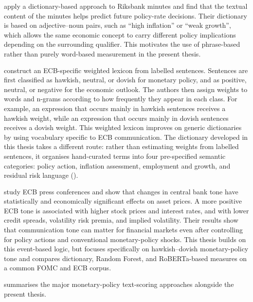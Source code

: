 \citet{apel2014} apply a dictionary-based approach to Riksbank minutes
and find that the textual content of the minutes helps predict future
policy-rate decisions. Their dictionary is based on adjective--noun
pairs, such as ``high inflation'' or ``weak growth'', which allows the
same economic concept to carry different policy implications depending
on the surrounding qualifier. This motivates the use of phrase-based
rather than purely word-based measurement in the present thesis.

\citet{picault2017} construct an ECB-specific weighted lexicon from
labelled sentences. Sentences are first classified as hawkish, neutral,
or dovish for monetary policy, and as positive, neutral, or negative for
the economic outlook. The authors then assign weights to words and
n-grams according to how frequently they appear in each class. For
example, an expression that occurs mainly in hawkish sentences receives a
hawkish weight, while an expression that occurs mainly in dovish
sentences receives a dovish weight. This weighted lexicon improves on
generic dictionaries by using vocabulary specific to ECB communication.
The dictionary developed in this thesis takes a different route: rather
than estimating weights from labelled sentences, it organises
hand-curated terms into four pre-specified semantic categories: policy
action, inflation assessment, employment and growth, and residual risk
language ().

\citet{schmeling2019} study ECB press conferences and show that changes
in central bank tone have statistically and economically significant
effects on asset prices. A more positive ECB tone is associated with
higher stock prices and interest rates, and with lower credit spreads,
volatility risk premia, and implied volatility. Their results show that
communication tone can matter for financial markets even after
controlling for policy actions and conventional monetary-policy shocks.
This thesis builds on this event-based logic, but focuses specifically on
hawkish--dovish monetary-policy tone and compares dictionary, Random
Forest, and RoBERTa-based measures on a common FOMC and ECB corpus.

 summarises the major monetary-policy
text-scoring approaches alongside the present thesis.

